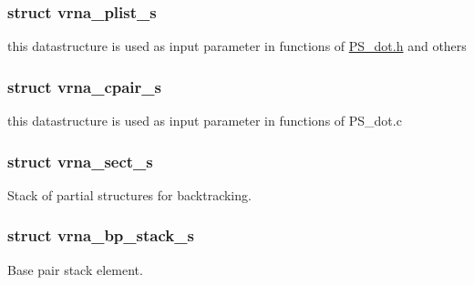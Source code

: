 \subsubsection{struct vrna\-\_\-plist\-\_\-s}
this datastructure is used as input parameter in functions of \hyperlink{PS__dot_8h}{P\-S\-\_\-dot.\-h} and others \label{structvrna__cpair__s}
\hypertarget{group__data__structures_structvrna__cpair__s}{}
\subsubsection{struct vrna\-\_\-cpair\-\_\-s}
this datastructure is used as input parameter in functions of P\-S\-\_\-dot.\-c \label{structvrna__sect__s}
\hypertarget{group__data__structures_structvrna__sect__s}{}
\subsubsection{struct vrna\-\_\-sect\-\_\-s}
Stack of partial structures for backtracking. \label{structvrna__bp__stack__s}
\hypertarget{group__data__structures_structvrna__bp__stack__s}{}
\subsubsection{struct vrna\-\_\-bp\-\_\-stack\-\_\-s}
Base pair stack element. \label{structpu__contrib}
\hypertarget{group__data__structures_structpu__contrib}{}

